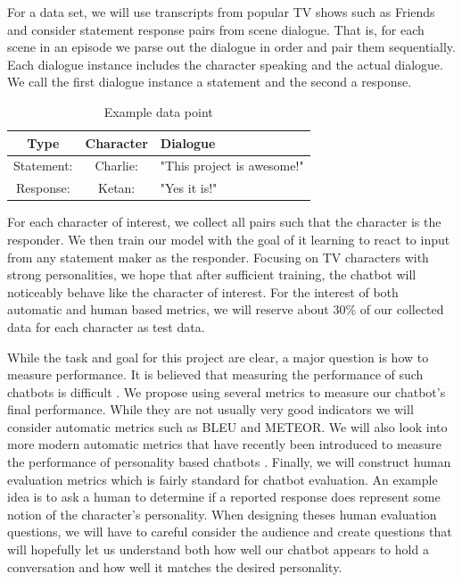 \documentclass{article}
\begin{document}
For a data set, we will use transcripts from popular TV shows such as Friends and consider statement response pairs from scene dialogue.
That is, for each scene in an episode we parse out the dialogue in order and pair them sequentially.
Each dialogue instance includes the character speaking and the actual dialogue.
We call the first dialogue instance a statement and the second a response.
\begin{table}
  \caption{Example data point}
  \label{sample-data}
  \centering
  \begin{tabular}{ c | c l }
    Type  & Character & Dialogue \\
    \hline
    Statement:  & Charlie:  & "This project is awesome!"    \\
    Response:   &  Ketan: & "Yes it is!"     \\
    \bottomrule
  \end{tabular}
\end{table}
For each character of interest, we collect all pairs such that the character is the responder. 
We then train our model with the goal of it learning to react to input from any statement maker as the responder.
Focusing on TV characters with strong personalities, we hope that after sufficient training, the chatbot will noticeably behave like the character of interest.
For the interest of both automatic and human based metrics, we will reserve about 30\% of our collected data for each character as test data.
 
While the task and goal for this project are clear, a major question is how to measure performance.
It  is believed that measuring the performance of such chatbots is difficult \cite{Radz2017, Xing2018, LiuLSNCP16,Devlin2018,SerbanLCP15}.
We propose using several metrics to measure our chatbot's final performance.
While they are not usually very good indicators we will consider automatic metrics such as BLEU and METEOR.
We will also look into more modern automatic metrics that have recently been introduced to measure the performance of personality based chatbots \cite{Xing2018}.
Finally, we will construct human evaluation metrics which is fairly standard for chatbot evaluation. 
An example idea is to ask a human to determine if a reported response does represent some notion of the character's personality.
When designing theses human evaluation questions, we will have to careful consider the audience and create questions that will hopefully let us understand both how well our chatbot appears to hold a conversation and how well it matches the desired personality.
\end{document}
